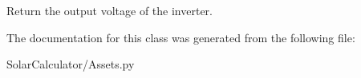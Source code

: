 \begin{DoxyVerb}Return the output voltage of the inverter. \end{DoxyVerb}
 

The documentation for this class was generated from the following file\-:\begin{DoxyCompactItemize}
\item 
Solar\-Calculator/Assets.\-py\end{DoxyCompactItemize}
